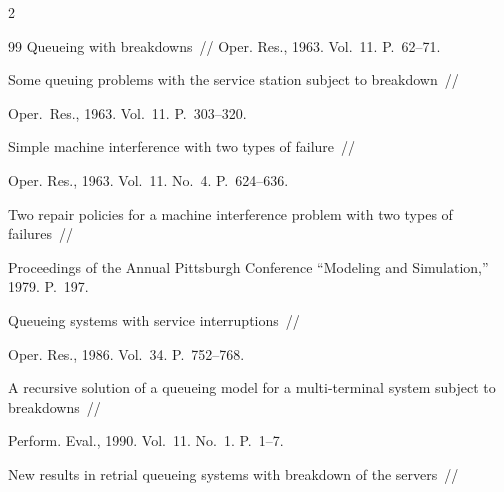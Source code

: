 \begin{multicols}{2}
{{\begin{thebibliography}{99}
Queueing with breakdowns~// Oper. Res., 1963. Vol.~11. P.~62--71.









Some queuing problems with the service station subject to breakdown~//


Oper.\ Res., 1963. Vol.~11. P.~303--320.









Simple machine interference with two types of failure~//


Oper. Res., 1963. Vol.~11. No.~4. P.~624--636.









Two repair policies for a machine interference problem with two types of failures~//


Proceedings of the Annual Pittsburgh Conference ``Modeling and Simulation,'' 1979. P.~197.









Queueing systems with service interruptions~//


Oper. Res., 1986. Vol.~34. P.~752--768.









A recursive solution of a queueing model for a multi-terminal system subject to breakdowns~//


Perform. Eval., 1990. Vol.~11. No.~1. P.~1--7.









New results in retrial queueing systems with breakdown of the servers~//



\end{thebibliography}}}
\end{multicols}
